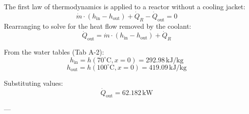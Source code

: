 The first law of thermodynamics is applied to a reactor without a cooling jacket:  
\[
\dot{m} \cdot (h_{\text{in}} - h_{\text{out}}) + \dot{Q}_R - \dot{Q}_{\text{out}} = 0
\]  
Rearranging to solve for the heat flow removed by the coolant:  
\[
\dot{Q}_{\text{out}} = \dot{m} \cdot (h_{\text{in}} - h_{\text{out}}) + \dot{Q}_R
\]  

From the water tables (Tab A-2):  
\[
h_{\text{in}} = h(70^\circ\text{C}, x = 0) = 292.98 \, \text{kJ/kg}
\]  
\[
h_{\text{out}} = h(100^\circ\text{C}, x = 0) = 419.09 \, \text{kJ/kg}
\]  

Substituting values:  
\[
\dot{Q}_{\text{out}} = 62.182 \, \text{kW}
\]  

---